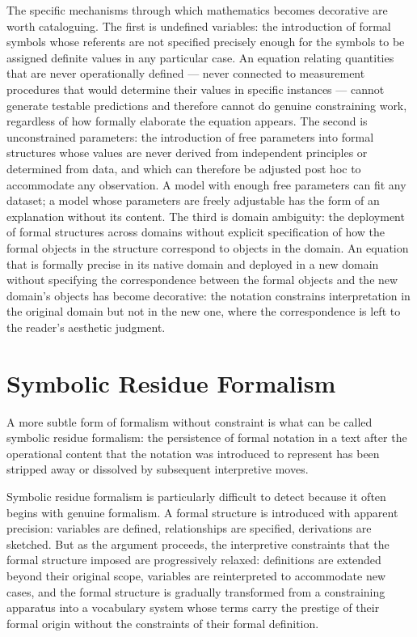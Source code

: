 \documentclass[12pt, openright, twoside]{book}
\begin{document}
The specific mechanisms through which mathematics becomes
decorative are worth cataloguing. The first is undefined variables:
the introduction of formal symbols whose referents are not
specified precisely enough for the symbols to be assigned definite
values in any particular case. An equation relating quantities
that are never operationally defined --- never connected to
measurement procedures that would determine their values in
specific instances --- cannot generate testable predictions and
therefore cannot do genuine constraining work, regardless of
how formally elaborate the equation appears. The second is
unconstrained parameters: the introduction of free parameters
into formal structures whose values are never derived from
independent principles or determined from data, and which can
therefore be adjusted post hoc to accommodate any observation.
A model with enough free parameters can fit any dataset; a
model whose parameters are freely adjustable has the form of
an explanation without its content. The third is domain
ambiguity: the deployment of formal structures across domains
without explicit specification of how the formal objects in
the structure correspond to objects in the domain. An equation
that is formally precise in its native domain and deployed in
a new domain without specifying the correspondence between
the formal objects and the new domain's objects has become
decorative: the notation constrains interpretation in the
original domain but not in the new one, where the correspondence
is left to the reader's aesthetic judgment.

\section{Symbolic Residue Formalism}

A more subtle form of formalism without constraint is what can
be called symbolic residue formalism: the persistence of formal
notation in a text after the operational content that the notation
was introduced to represent has been stripped away or dissolved
by subsequent interpretive moves.

Symbolic residue formalism is particularly difficult to detect
because it often begins with genuine formalism. A formal structure
is introduced with apparent precision: variables are defined,
relationships are specified, derivations are sketched. But as
the argument proceeds, the interpretive constraints that the
formal structure imposed are progressively relaxed: definitions
are extended beyond their original scope, variables are reinterpreted
to accommodate new cases, and the formal structure is gradually
transformed from a constraining apparatus into a vocabulary
system whose terms carry the prestige of their formal origin
without the constraints of their formal definition.
\end{document}
